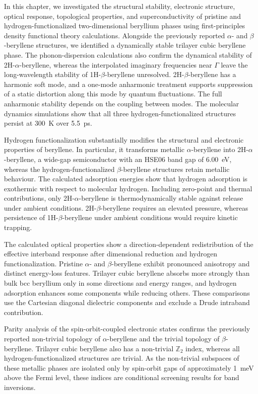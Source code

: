 In this chapter,
we investigated the structural stability,
electronic structure,
optical response,
topological properties,
and superconductivity of pristine and hydrogen-functionalized two-dimensional beryllium phases using first-principles density functional theory calculations.
Alongside the previously reported $\alpha$- and $\beta$-beryllene structures,
we identified a dynamically stable trilayer cubic beryllene phase.
The phonon-dispersion calculations also confirm the dynamical stability of 2H-$\alpha$-beryllene,
whereas the interpolated imaginary frequencies near $\Gamma$ leave the long-wavelength stability of 1H-$\beta$-beryllene unresolved.
2H-$\beta$-beryllene has a harmonic soft mode,
and a one-mode anharmonic treatment supports suppression of a static distortion along this mode by quantum fluctuations.
The full anharmonic stability depends on the coupling between modes.
The molecular dynamics simulations show that all three hydrogen-functionalized structures persist at \qty{300}{\kelvin} over \qty{5.5}{\pico\second}.

Hydrogen functionalization substantially modifies the structural and electronic properties of beryllene.
In particular,
it transforms metallic $\alpha$-beryllene into 2H-$\alpha$-beryllene,
a wide-gap semiconductor with an HSE06 band gap of \qty{6.00}{\electronvolt},
whereas the hydrogen-functionalized $\beta$-beryllene structures retain metallic behaviour.
The calculated adsorption energies show that hydrogen adsorption is exothermic with respect to molecular hydrogen.
Including zero-point and thermal contributions,
only 2H-$\alpha$-beryllene is thermodynamically stable against  release under ambient conditions.
2H-$\beta$-beryllene requires an elevated  pressure,
whereas persistence of 1H-$\beta$-beryllene under ambient conditions would require kinetic trapping.

The calculated optical properties show a direction-dependent redistribution of the effective interband response after dimensional reduction and hydrogen functionalization.
Pristine $\alpha$- and $\beta$-beryllene exhibit pronounced anisotropy and distinct energy-loss features.
Trilayer cubic beryllene absorbs more strongly than bulk bcc beryllium only in some directions and energy ranges,
and hydrogen adsorption enhances some components while reducing others.
These comparisons use the Cartesian diagonal dielectric components and exclude a Drude intraband contribution.

Parity analysis of the spin-orbit-coupled electronic states confirms the previously reported non-trivial topology of $\alpha$-beryllene and the trivial topology of $\beta$-beryllene.
Trilayer cubic beryllene also has a non-trivial $\mathbb{Z}_2$ index,
whereas all hydrogen-functionalized structures are trivial.
As the non-trivial subspaces of these metallic phases are isolated only by spin-orbit gaps of approximately \qty{1}{\milli\electronvolt} above the Fermi level,
these indices are conditional screening results for band inversions.

